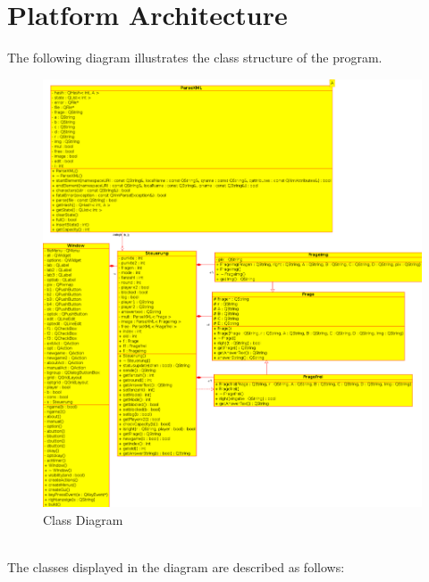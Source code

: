 \documentclass[10pt,a4paper,titlepage]{article}
\begin{document}
\section{Platform Architecture}
The following diagram illustrates the class structure of the program.
\begin{figure}
	\includegraphics[width=\linewidth]{img/doku.png}
	\caption{Class Diagram}
\end{figure}
\\The classes displayed in the diagram are described as follows:
\end{document}
